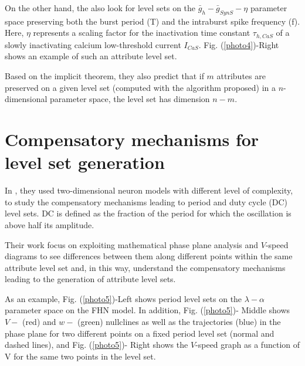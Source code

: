 On the other hand, the also look for level sets on the $\bar{g}_{h}-\bar{g}_{SynS}-\eta$ parameter space preserving both the burst period (T) and the intraburst spike frequency (f). Here, $\eta$ represents a scaling factor for the inactivation time constant $\tau_{h,CaS}$ of a slowly inactivating calcium low-threshold current $I_{CaS}$. Fig. (\ref{photo4})-Right shows an example of such an attribute level set.

Based on the implicit theorem, they also predict that if $m$ attributes are preserved on a given level set (computed with the algorithm proposed) in a $n$-dimensional parameter space, the level set has dimension $n-m$. 

\section{Compensatory mechanisms for level set generation}
In \cite{Rot}, they used two-dimensional neuron models with different level of complexity, to study the compensatory mechanisms leading to period and duty cycle (DC) level sets. DC is defined as the fraction of the period for which the oscillation is above half its amplitude.

Their work focus on exploiting mathematical phase plane analysis and $V$-speed diagrams to see differences between them along different points within the same attribute level set and, in this way, understand the compensatory mechanisms leading to the generation of attribute level sets.

As an example, Fig. (\ref{photo5})-Left shows period level sets on the $\lambda-\alpha$ parameter space on the FHN model. In addition, Fig. (\ref{photo5})- Middle shows $V-$ (red) and $w-$ (green) nullclines as well as the trajectories (blue) in the phase plane for two different points on a fixed period level set (normal and dashed lines), and Fig. (\ref{photo5})- Right shows the $V$-speed graph as a function of V for the same two points in the level set.

